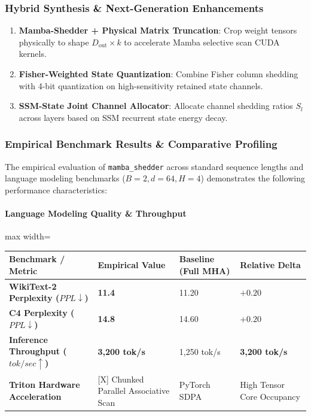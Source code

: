 \subsubsection*{Hybrid Synthesis \& Next-Generation Enhancements}

\begin{enumerate}
\item \textbf{Mamba-Shedder + Physical Matrix Truncation}: Crop weight tensors physically to shape $D_{\text{out}} \times k$ to accelerate Mamba selective scan CUDA kernels.
\item \textbf{Fisher-Weighted State Quantization}: Combine Fisher column shedding with 4-bit quantization on high-sensitivity retained state channels.
\item \textbf{SSM-State Joint Channel Allocator}: Allocate channel shedding ratios $S_l$ across layers based on SSM recurrent state energy decay.

\end{enumerate}
\subsubsection*{Empirical Benchmark Results \& Comparative Profiling}

The empirical evaluation of \texttt{mamba\_shedder} across standard sequence lengths and language modeling benchmarks ($B=2, d=64, H=4$) demonstrates the following performance characteristics:

\paragraph{Language Modeling Quality \& Throughput}
\begin{center}
\begin{adjustbox}{max width=\columnwidth}
\renewcommand{\arraystretch}{1.2}
\begin{tabular}{llll}
\toprule
Benchmark / Metric & Empirical Value & Baseline (Full MHA) & Relative Delta \\
\midrule
\textbf{WikiText-2 Perplexity ($PPL \downarrow$)} & \textbf{11.4} & 11.20 & $+0.20$ \\
\textbf{C4 Perplexity ($PPL \downarrow$)} & \textbf{14.8} & 14.60 & $+0.20$ \\
\textbf{Inference Throughput ($tok/sec \uparrow$)} & \textbf{3,200 tok/s} & 1,250 tok/s & \textbf{3,200 tok/s} \\
\textbf{Triton Hardware Acceleration} & [X] Chunked Parallel Associative Scan & PyTorch SDPA & High Tensor Core Occupancy \\

\bottomrule
\end{tabular}
\end{adjustbox}
\end{center}
